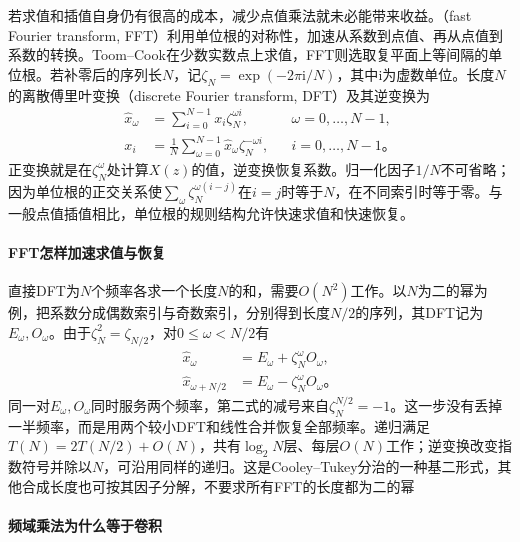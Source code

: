 若求值和插值自身仍有很高的成本，减少点值乘法就未必能带来收益。（fast Fourier transform, FFT）利用单位根的对称性，加速从系数到点值、再从点值到系数的转换。Toom--Cook在少数实数点上求值，FFT则选取复平面上等间隔的单位根。若补零后的序列长$N$，记$\zeta_N=\exp(-2\pi\mathrm i/N)$，其中$\mathrm i$为虚数单位。长度$N$的离散傅里叶变换（discrete Fourier transform, DFT）及其逆变换为
\begin{equation}
  \begin{aligned}
    \widehat x_\omega&=\sum_{i=0}^{N-1}x_i\zeta_N^{\omega i},
       &&\omega=0,\ldots,N-1,\\
    x_i&=\frac1N\sum_{\omega=0}^{N-1}
                    \widehat x_\omega\zeta_N^{-\omega i},
       &&i=0,\ldots,N-1\text{。}
  \end{aligned}
  \label{eq:cnn-dft-inverse}
\end{equation}
正变换就是在$\zeta_N^\omega$处计算$X(z)$的值，逆变换恢复系数。归一化因子$1/N$不可省略；因为单位根的正交关系使$\sum_\omega\zeta_N^{\omega(i-j)}$在$i=j$时等于$N$，在不同索引时等于零。与一般点值插值相比，单位根的规则结构允许快速求值和快速恢复。

\paragraph{FFT怎样加速求值与恢复}

直接DFT为$N$个频率各求一个长度$N$的和，需要$O(N^2)$工作。以$N$为二的幂为例，把系数分成偶数索引与奇数索引，分别得到长度$N/2$的序列，其DFT记为$E_\omega,O_\omega$。由于$\zeta_N^2=\zeta_{N/2}$，对$0\leq\omega<N/2$有
\begin{equation}
  \begin{aligned}
    \widehat x_\omega&=E_\omega+\zeta_N^\omega O_\omega,\\
    \widehat x_{\omega+N/2}&=E_\omega-\zeta_N^\omega O_\omega\text{。}
  \end{aligned}
  \label{eq:cnn-fft-butterfly}
\end{equation}
同一对$E_\omega,O_\omega$同时服务两个频率，第二式的减号来自$\zeta_N^{N/2}=-1$。这一步没有丢掉一半频率，而是用两个较小DFT和线性合并恢复全部频率。递归满足$T(N)=2T(N/2)+O(N)$，共有$\log_2N$层、每层$O(N)$工作；逆变换改变指数符号并除以$N$，可沿用同样的递归。这是Cooley--Tukey分治的一种基二形式，其他合成长度也可按其因子分解，不要求所有FFT的长度都为二的幂

\paragraph{频域乘法为什么等于卷积}

